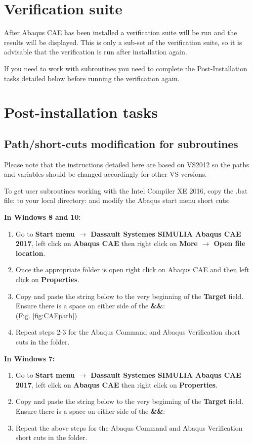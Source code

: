 \documentclass[10pt,a4paper,oneside]{article}
\begin{document}
\section{Verification suite}
After Abaqus CAE has been installed a verification suite will be run and the results will be displayed. This is only a sub-set of the verification suite, so it is advisable that the verification is run after installation again. 

If you need to work with subroutines you need to complete the Post-Installation tasks detailed below before running the verification again.

\section{Post-installation tasks}
\subsection{Path/short-cuts modification for subroutines} \label{sec:path}
Please note that the instructions detailed here are based on VS2012 so the paths and variables should be changed accordingly for other VS versions.

To get user subroutines working with the Intel Compiler XE 2016, copy the .bat file:  to your local directory:  and modify the Abaqus start menu short cuts:

\textbf{In Windows 8 and 10:}
\begin{enumerate}
\item Go to \textbf{Start menu $\rightarrow$ Dassault Systemes SIMULIA Abaqus CAE 2017}, left click on \textbf{Abaqus CAE} then right click on \textbf{More $\rightarrow$ Open file location}.
\item Once the appropriate folder is open right click on Abaqus CAE and then left click on \textbf{Properties}. 
\item Copy and paste the string below to the very beginning of the \textbf{Target} field. Ensure there is a space on either side of the \textbf{\&\&}:\\
\textbf{} (Fig. \ref{fig:CAEpath})
\item Repeat steps 2-3 for the Abaqus Command and Abaqus Verification short cuts in the folder.
\end{enumerate}

\textbf{In Windows 7:}
\begin{enumerate}
\item Go to \textbf{Start menu $\rightarrow$ Dassault Systemes SIMULIA Abaqus CAE 2017}, left click on \textbf{Abaqus CAE} then right click on \textbf{Properties}.
\item Copy and paste the string below to the very beginning of the \textbf{Target} field. Ensure there is a space on either side of the \textbf{\&\&}:\\
\textbf{}
\item Repeat the above steps for the Abaqus Command and Abaqus Verification short cuts in the folder.
\end{enumerate}
\end{document}
